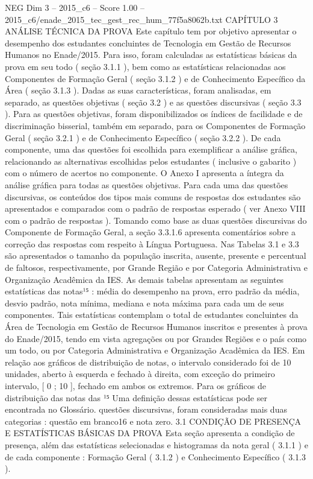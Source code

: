 \begin{textsample}{NEG Dim 3 – 2015\_c6 – Score 1.00 – 2015\_c6/enade\_2015\_tec\_gest\_rec\_hum\_77f5a8062b.txt}  \label{ex:f3_neg_068}
CAPÍTULO 3 ANÁLISE TÉCNICA DA PROVA Este capítulo tem por objetivo apresentar o desempenho dos estudantes concluintes de Tecnologia em Gestão de Recursos Humanos no Enade/2015.
Para isso, foram calculadas as estatísticas básicas da prova em seu todo ( seção 3.1.1 ), bem como as estatísticas relacionadas aos Componentes de Formação Geral ( seção 3.1.2 ) e de Conhecimento Específico da Área ( seção 3.1.3 ).
Dadas as suas características, foram analisadas, em separado, as questões objetivas ( seção 3.2 ) e as questões discursivas ( seção 3.3 ).
Para as questões objetivas, foram disponibilizados os índices de facilidade e de discriminação bisserial, também em separado, para os Componentes de Formação Geral ( seção 3.2.1 ) e de Conhecimento Específico ( seção 3.2.2 ).
De cada componente, uma das questões foi escolhida para exemplificar a análise gráfica, relacionando as alternativas escolhidas pelos estudantes ( inclusive o gabarito ) com o número de acertos no componente.
O Anexo I apresenta a íntegra da análise gráfica para todas as questões objetivas.
Para cada uma das questões discursivas, os conteúdos dos tipos mais comuns de respostas dos estudantes são apresentados e comparados com o padrão de respostas esperado ( ver Anexo VIII com o padrão de respostas ).
Tomando como base as duas questões discursivas do Componente de Formação Geral, a seção 3.3.1.6 apresenta comentários sobre a correção das respostas com respeito à Língua Portuguesa.
Nas Tabelas 3.1 e 3.3 são apresentados o tamanho da população inscrita, ausente, presente e percentual de faltosos, respectivamente, por Grande Região e por Categoria Administrativa e Organização Acadêmica da IES.
As demais tabelas apresentam as seguintes estatísticas das notas¹⁵ : média do desempenho na prova, erro padrão da média, desvio padrão, nota mínima, mediana e nota máxima para cada um de seus componentes.
Tais estatísticas contemplam o total de estudantes concluintes da Área de Tecnologia em Gestão de Recursos Humanos inscritos e presentes à prova do Enade/2015, tendo em vista agregações ou por Grandes Regiões e o país como um todo, ou por Categoria Administrativa e Organização Acadêmica da IES.
Em relação aos gráficos de distribuição de notas, o intervalo considerado foi de 10 unidades, aberto à esquerda e fechado à direita, com exceção do primeiro intervalo, [ 0 ; 10 ], fechado em ambos os extremos.
Para os gráficos de distribuição das notas das ¹⁵ Uma definição dessas estatísticas pode ser encontrada no Glossário. questões discursivas, foram consideradas mais duas categorias : questão em branco16 e nota zero. 3.1 CONDIÇÃO DE PRESENÇA E ESTATÍSTICAS BÁSICAS DA PROVA Esta seção apresenta a condição de presença, além das estatísticas selecionadas e histogramas da nota geral ( 3.1.1 ) e de cada componente : Formação Geral ( 3.1.2 ) e Conhecimento Específico ( 3.1.3 ).

\end{textsample}
